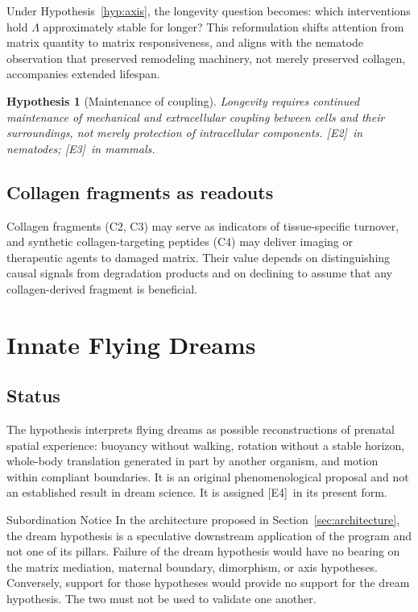 \documentclass[11pt,a4paper]{article}
\theoremstyle{plain}
\newtheorem{hypothesis}{Hypothesis}[section]
\theoremstyle{definition}
\theoremstyle{remark}
\newcommand{\tier}[1]{\textup{\textsc{[#1]}}}
\newcommand{\Etwo}{\tier{E2}}
\newcommand{\Ethree}{\tier{E3}}
\newcommand{\Efour}{\tier{E4}}
\begin{document}
Under Hypothesis~\ref{hyp:axis}, the longevity question becomes: which interventions hold $\Lambda$ approximately stable for longer? This reformulation shifts attention from matrix quantity to matrix responsiveness, and aligns with the nematode observation that preserved remodeling machinery, not merely preserved collagen, accompanies extended lifespan.

\begin{hypothesis}[Maintenance of coupling]
Longevity requires continued maintenance of mechanical and extracellular coupling between cells and their surroundings, not merely protection of intracellular components. \Etwo\ in nematodes; \Ethree\ in mammals.
\end{hypothesis}

\subsection{Collagen fragments as readouts}

Collagen fragments (C2, C3) may serve as indicators of tissue-specific turnover, and synthetic collagen-targeting peptides (C4) may deliver imaging or therapeutic agents to damaged matrix. Their value depends on distinguishing causal signals from degradation products and on declining to assume that any collagen-derived fragment is beneficial.
\section{Innate Flying Dreams}\label{sec:dreams}

\subsection{Status}

The hypothesis interprets flying dreams as possible reconstructions of prenatal spatial experience: buoyancy without walking, rotation without a stable horizon, whole-body translation generated in part by another organism, and motion within compliant boundaries. It is an original phenomenological proposal and not an established result in dream science. It is assigned \Efour\ in its present form.

\begin{statusbox}{Subordination Notice}
\small
In the architecture proposed in Section~\ref{sec:architecture}, the dream hypothesis is a speculative downstream application of the program and not one of its pillars. Failure of the dream hypothesis would have no bearing on the matrix mediation, maternal boundary, dimorphism, or axis hypotheses. Conversely, support for those hypotheses would provide no support for the dream hypothesis. The two must not be used to validate one another.
\end{statusbox}
\end{document}
